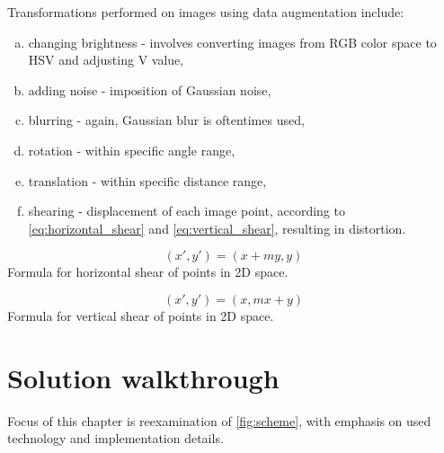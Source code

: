 \documentclass[11pt, a4paper]{article}
\begin{document}
Transformations performed on images using data augmentation include:
\begin{enumerate}[a)]
\item changing brightness - involves converting images from RGB color space to HSV \cite{hsv_def} and adjusting V value,
\item adding noise - imposition of Gaussian noise,
\item blurring - again, Gaussian blur is oftentimes used,
\item rotation - within specific angle range,
\item translation - within specific distance range,
\item shearing - displacement of each image point, according to \autoref{eq:horizontal_shear} and \ref{eq:vertical_shear}, resulting in distortion.
\end{enumerate}

\begin{equation} \label{eq:horizontal_shear}
(x', y') = (x + my, y)
\end{equation}
Formula for horizontal shear of points in 2D space.

\begin{equation} \label{eq:vertical_shear}
(x', y')=(x, mx +y)
\end{equation}
Formula for vertical shear of points in 2D space.
\clearpage

\section{Solution walkthrough} \label{solution_walkthrough}
Focus of this chapter is reexamination of \autoref{fig:scheme}, with emphasis on used technology and implementation details.
\end{document}

